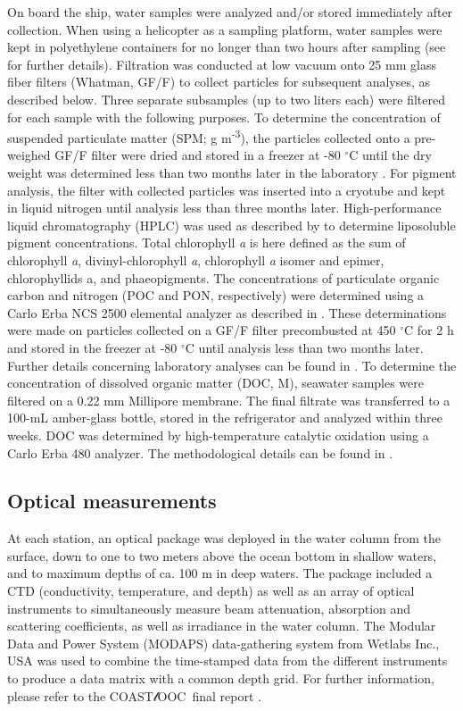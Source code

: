 \documentclass[essd, manuscript]{copernicus}
\newcommand{\coastlooc}{COAST$\mathscr{l}$OOC~\allowbreak}
\begin{document}
On board the ship, water samples were analyzed and/or stored immediately after collection. When using a helicopter as a sampling platform, water samples were kept in polyethylene containers for no longer than two hours after sampling (see \citealt{Babin2003b} for further details). Filtration was conducted at low vacuum onto 25 mm glass fiber filters (Whatman, GF/F) to collect particles for subsequent analyses, as described below. Three separate subsamples (up to two liters each) were filtered for each sample with the following purposes. To determine the concentration of suspended particulate matter (SPM; g m\textsuperscript{-3}), the particles collected onto a pre-weighed GF/F filter were dried and stored in a freezer at -80 $^{\circ}$C until the dry weight was determined less than two months later in the laboratory \citep{VanDerLinde1998}. For pigment analysis, the filter with collected particles was inserted into a cryotube and kept in liquid nitrogen until analysis less than three months later. High-performance liquid chromatography (HPLC) was used as described by \citealt{Vidussi1996} to determine liposoluble pigment concentrations. Total chlorophyll \textit{a} is here defined as the sum of chlorophyll \textit{a}, divinyl-chlorophyll \textit{a}, chlorophyll \textit{a} isomer and epimer, chlorophyllids a, and phaeopigments. The concentrations of particulate organic carbon and nitrogen (POC and PON, respectively) were determined using a Carlo Erba NCS 2500 elemental analyzer as described in \citealt{Ferrari2003}. These determinations were made on particles collected on a GF/F filter precombusted at 450 $^{\circ}$C for 2 h and stored in the freezer at -80 $^{\circ}$C until analysis less than two months later. Further details concerning laboratory analyses can be found in \citealt{Babin2003b, Ferrari2000, Ferrari2003}. To determine the concentration of dissolved organic matter (DOC, M), seawater samples were filtered on a 0.22 mm Millipore membrane. The final filtrate was transferred to a 100-mL amber-glass bottle, stored in the refrigerator and analyzed within three weeks. DOC was determined by high-temperature catalytic oxidation using a Carlo Erba 480 analyzer. The methodological details can be found in \citealt{Ferrari2000}.

\subsection{Optical measurements}

At each station, an optical package was deployed in the water column from the surface, down to one to two meters above the ocean bottom in shallow waters, and to maximum depths of ca. 100 m in deep waters. The package included a CTD (conductivity, temperature, and depth) as well as an array of optical instruments to simultaneously measure beam attenuation, absorption and scattering coefficients, as well as irradiance in the water column. The Modular Data and Power System (MODAPS) data-gathering system from Wetlabs Inc., USA was used to combine the time-stamped data from the different instruments to produce a data matrix with a common depth grid. For further information, please refer to the \coastlooc final report \citep{Coastlooc2000}.
\end{document}
